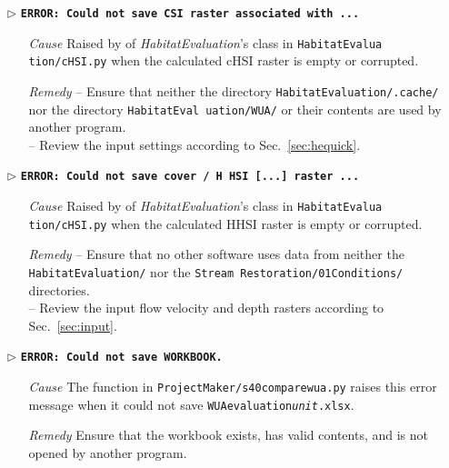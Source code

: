 \begin{itemize}
	\item[$\triangleright$]\textbf{\texttt{ERROR: Could not save CSI raster associated with ...}}
	\begin{itemize}
		\item[\textit{Cause}\hspace{0.27cm}] Raised by  of \textit{HabitatEvaluation}'s  class in \texttt{HabitatEvalua tion/cHSI.py} when the calculated cHSI raster is empty or corrupted.
		\item[\textit{Remedy}] -- Ensure that neither the directory \texttt{HabitatEvaluation/.cache/} nor the directory \texttt{HabitatEval uation/WUA/} or their contents are used by another program.\\
							 -- Review the input settings according to Sec.~\ref{sec:hequick}.\\
	\end{itemize}
	
	\item[$\triangleright$]\textbf{\texttt{ERROR: Could not save cover / H HSI [...] raster ...}}
	\begin{itemize}
		\item[\textit{Cause}\hspace{0.27cm}] Raised by  of \textit{HabitatEvaluation}'s  class in \texttt{HabitatEvalua tion/cHSI.py} when the calculated HHSI raster is empty or corrupted.
		\item[\textit{Remedy}]  -- Ensure that no other software uses data from neither the \texttt{HabitatEvaluation/} nor the \texttt{Stream Restoration/01{\myUnderscore}Conditions/} directories.\\
							 -- Review the input flow velocity and depth rasters according to Sec.~\ref{sec:input}.\\
	\end{itemize}
	
	\item[$\triangleright$]\textbf{\texttt{ERROR: Could not save WORKBOOK.}}
	\begin{itemize}
		\item[\textit{Cause}\hspace{0.27cm}] The  function in \texttt{ProjectMaker/s40{\myUnderscore}compare{\myUnderscore}wua.py} raises this error message when it could not save \texttt{WUA{\myUnderscore}evaluation\textit{{\myUnderscore}unit}.xlsx}.
		\item[\textit{Remedy}] Ensure that the workbook exists, has valid contents, and is not opened by another program.\\
	\end{itemize}
		

\end{itemize}
